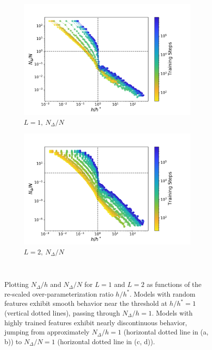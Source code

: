 \documentclass[11pt]{article}
\begin{document}
\begin{figure}[!h]
{\begin{subfigure}{.6\textwidth}
      \includegraphics[width=\linewidth]{docs/assets/h_h_star_vs_N_del_N_L=1.pdf}
      \caption{$L=1, \ N_\Delta/N$}
    \end{subfigure}%
    \begin{subfigure}{.6\textwidth}
      \centering
      \includegraphics[width=\linewidth]{docs/assets/h_h_star_vs_N_del_N_L=2.pdf}
      \caption{$L=2, \ N_\Delta/N$}
    \end{subfigure}
}\\
\caption{Plotting $N_\Delta/h$ and $N_\Delta/N$ for $L=1$ and $L=2$ as functions of the re-scaled over-parameterization ratio $h/h^*$. Models with random features exhibit smooth behavior near the threshold at $h/h^*=1$ (vertical dotted lines), passing through $N_\Delta/h=1$. Models with highly trained features exhibit nearly discontinuous behavior, jumping from approximately $N_\Delta/h=1$ (horizontal dotted line in (a, b)) to $N_\Delta/N=1$ (horizontal dotted line in (c, d)).}
\label{N_del_discontinuity}
\end{figure}
\end{document}

